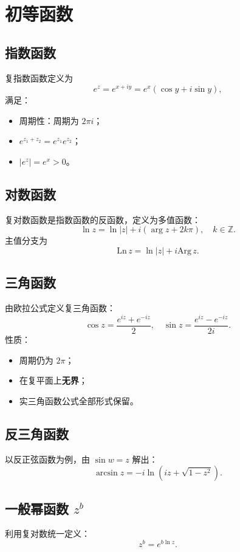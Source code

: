 \section{初等函数}
\subsection{指数函数}
\begin{tcolorbox}
	复指数函数定义为
	$$e^z = e^{x+iy} = e^x(\cos y + i\sin y),$$
	满足：
	\begin{itemize}
		\item 周期性：周期为 $2\pi i$；
		\item $e^{z_1+z_2}=e^{z_1}e^{z_2}$；
		\item $|e^z|=e^x>0$。
	\end{itemize}
\end{tcolorbox}

\subsection{对数函数}
\begin{tcolorbox}
	复对数函数是指数函数的反函数，定义为多值函数：
	$$\ln z = \ln|z| + i\left(\arg z + 2k\pi\right),\quad k\in\mathbb{Z}.$$
	主值分支为
	$$\mathrm{Ln}\,z = \ln|z| + i\mathrm{Arg}\,z.$$
\end{tcolorbox}

\subsection{三角函数}
\begin{tcolorbox}
	由欧拉公式定义复三角函数：
	$$\cos z = \frac{e^{iz} + e^{-iz}}{2},\quad \sin z = \frac{e^{iz} - e^{-iz}}{2i}.$$
	性质：
	\begin{itemize}
		\item 周期仍为 $2\pi$；
		\item 在复平面上\textbf{无界}；
		\item 实三角函数公式全部形式保留。
	\end{itemize}
\end{tcolorbox}

\subsection{反三角函数}
\begin{tcolorbox}
	以反正弦函数为例，由 $\sin w = z$ 解出：
	$$\arcsin z = -i \ln\left(iz + \sqrt{1-z^2}\right).$$
\end{tcolorbox}

\subsection{一般幂函数 $z^b$}
\begin{tcolorbox}
	利用复对数统一定义：
	$$z^b = e^{b\ln z}.$$
\end{tcolorbox}